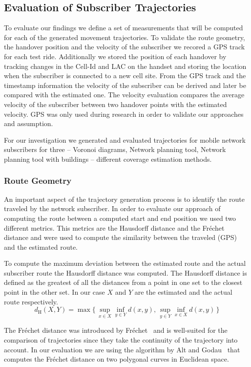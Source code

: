 \documentclass[twocolumn]{bmcart}%
\begin{document}
\subsection*{Evaluation of Subscriber Trajectories}
To evaluate our findings we define a set of measurements that will be computed for each of the generated movement trajectories. To validate the route geometry, the handover position and the velocity of the subscriber we recored a GPS track for each test ride. Additionally we stored the position of each handover by tracking changes in the Cell-Id and LAC on the handset and storing the location when the subscriber is connected to a new cell site. From the GPS track and the timestamp information the velocity of the subscriber can be derived and later be compared with the estimated one. The velocity evaluation compares  the average velocity of the subscriber between two handover points with the estimated velocity. GPS was only used during research in order to validate our approaches and assumption.

For our investigation we generated and evaluated trajectories for mobile network subscribers for three -- Voronoi diagrams, Network planning tool, Network planning tool with buildings -- different coverage estimation methods.
\subsubsection*{Route Geometry}
An important aspect of the trajectory generation process is to identify the route traveled by the network subscriber. In order to evaluate our approach of computing the route between a computed start and end position we used two different metrics. This metrics are the Hausdorff distance and the Fr\'{e}chet distance and were used to compute the similarity between the traveled (GPS) and the estimated route. 

To compute the maximum deviation between the estimated route and the actual subscriber route the Hausdorff distance was computed. The Hausdorff distance is defined as the greatest of all the distances from a point in one set to the closest point in the other set. In our case $X$ and $Y$ are the estimated and the actual route respectively.
\[ d_{\mathrm H}(X,Y) = \max\{\,\sup_{x \in X} \inf_{y \in Y} d(x,y),\, \sup_{y \in Y} \inf_{x \in X} d(x,y)\,\}\]

The Fr\'{e}chet distance was introduced by Fr\'{e}chet~\cite{Frechet} and is well-suited for the comparison of trajectories since they take the continuity of the trajectory into account. In our evaluation we are using the algorithm by Alt and Godau~\cite{Alt1995} that computes the Fr\'{e}chet distance on two polygonal curves in Euclidean space.
\end{document}
